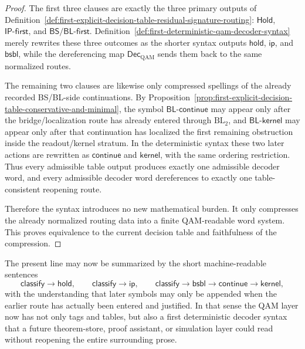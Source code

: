 \begin{proof}
The first three clauses are exactly the three primary outputs of Definition~\ref{def:first-explicit-decision-table-residual-signature-routing}: \(\mathsf{Hold}\), \(\mathsf{IP\text{-}first}\), and \(\mathsf{BS/BL\text{-}first}\). Definition~\ref{def:first-deterministic-qam-decoder-syntax} merely rewrites these three outcomes as the shorter syntax outputs \(\mathsf{hold}\), \(\mathsf{ip}\), and \(\mathsf{bsbl}\), while the dereferencing map \(\mathsf{Dec}_{\mathrm{QAM}}\) sends them back to the same normalized routes.

The remaining two clauses are likewise only compressed spellings of the already recorded BS/BL-side continuations. By Proposition~\ref{prop:first-explicit-decision-table-conservative-and-minimal}, the symbol \(\mathsf{BL\text{-}continue}\) may appear only after the bridge/localization route has already entered through \(\mathrm{BL}_2\), and \(\mathsf{BL\text{-}kernel}\) may appear only after that continuation has localized the first remaining obstruction inside the readout/kernel stratum. In the deterministic syntax these two later actions are rewritten as \(\mathsf{continue}\) and \(\mathsf{kernel}\), with the same ordering restriction. Thus every admissible table output produces exactly one admissible decoder word, and every admissible decoder word dereferences to exactly one table-consistent reopening route.

Therefore the syntax introduces no new mathematical burden. It only compresses the already normalized routing data into a finite QAM-readable word system. This proves equivalence to the current decision table and faithfulness of the compression.
\end{proof}

\begin{remark}
\label{rem:immediate-machine-reading-deterministic-decoder-syntax}
The present line may now be summarized by the short machine-readable sentences
\[
\mathsf{classify}\to\mathsf{hold},\qquad
\mathsf{classify}\to\mathsf{ip},\qquad
\mathsf{classify}\to\mathsf{bsbl}\to\mathsf{continue}\to\mathsf{kernel},
\]
with the understanding that later symbols may only be appended when the earlier route has actually been entered and justified. In that sense the QAM layer now has not only tags and tables, but also a first deterministic decoder syntax that a future theorem-store, proof assistant, or simulation layer could read without reopening the entire surrounding prose.
\end{remark}




